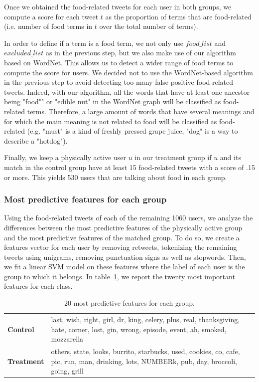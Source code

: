 \documentclass[letterpaper]{article}
\begin{document}
Once we obtained the food-related tweets for each user in both groups, we
compute a score for each tweet $t$ as the proportion of terms that are
food-related (i.e. number of food terms in $t$ over the total number of terms).

In order to define if a term is a food term, we not only use $food\_list$ and
$excluded\_list$ as in the previous step, but we also make use of our algorithm
based on WordNet. This allows us to detect a wider range of food terms to
compute the score for users. We decided not to use the WordNet-based algorithm
in the previous step to avoid detecting too many false positive food-related
tweets. Indeed, with our algorithm, all the words that have at least one
ancestor being "food"" or "edible nut" in the WordNet graph will be classified
as food-related terms. Therefore, a large amount of words that have several
meanings and for which the main meaning is not related to food will be
classified as food-related (e.g. "must" is a kind of freshly pressed grape
juice, "dog" is a way to describe a "hotdog").

Finally, we keep a physically active user $u$ in our treatment group if $u$ and
its match in the control group have at least 15 food-related tweets with a score
of .15 or more. This yields 530 users that are talking about food in each group.

\subsubsection{Most predictive features for each group}

Using the food-related tweets of each of the remaining 1060 users, we analyze
the differences between the most predictive features of the physically active
group and the most predictive features of the matched group. To do so, we create
a features vector for each user by removing retweets, tokenizing the remaining
tweets using unigrams, removing punctuation signs as well as stopwords. Then, we
fit a linear SVM model on these features where the label of each user is the
group to which it belongs. In table~\ref{tab:top_fts_all}, we report the twenty most important features for each class.

\begin{table}
  \center
\begin{tabular}{lp{}}
\toprule
\textbf{Control}  &  last, wish, right, girl, dr, king, celery, plus, real, thanksgiving, hate, corner, lost, gin, wrong, episode, event, ah, smoked, mozzarella \\
\textbf{Treatment} & others, state, looks, burrito, starbucks, used, cookies, co, cafe, pic, run, man, drinking, lots, NUMBERk, pub, day, broccoli, going, grill \\
\bottomrule
\end{tabular}
  \label{tab:top_fts_all}
  \caption{20 most predictive features for each group.}
\end{table}
\end{document}

